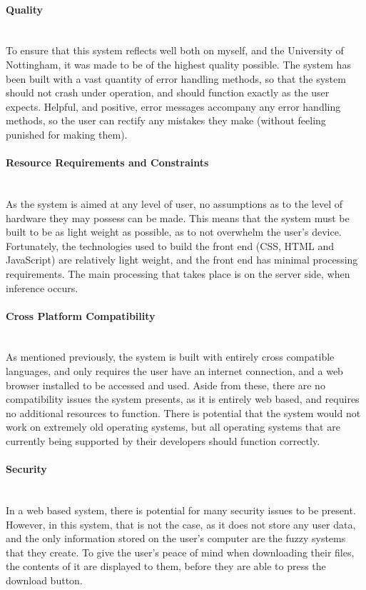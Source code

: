 \paragraph{Quality}\ \\
To ensure that this system reflects well both on myself, and the University of Nottingham, it was made to be of the highest quality possible. The system has been built with a vast quantity of error handling methods, so that the system should not crash under operation, and should function exactly as the user expects. Helpful, and positive, error messages accompany any error handling methods, so the user can rectify any mistakes they make (without feeling punished for making them). 

\paragraph{Resource Requirements and Constraints}\ \\
As the system is aimed at any level of user, no assumptions as to the level of hardware they may possess can be made. This means that the system must be built to be as light weight as possible, as to not overwhelm the user's device. Fortunately, the technologies used to build the front end (CSS, HTML and JavaScript) are relatively light weight, and the front end has minimal processing requirements. The main processing that takes place is on the server side, when inference occurs.

\paragraph{Cross Platform Compatibility}\ \\
As mentioned previously, the system is built with entirely cross compatible languages, and only requires the user have an internet connection, and a web browser installed to be accessed and used. Aside from these, there are no compatibility issues the system presents, as it is entirely web based, and requires no additional resources to function. There is potential that the system would not work on extremely old operating systems, but all operating systems that are currently being supported by their developers should function correctly.

\paragraph{Security}\ \\
In a web based system, there is potential for many security issues to be present. However, in this system, that is not the case, as it does not store any user data, and the only information stored on the user's computer are the fuzzy systems that they create. To give the user's peace of mind when downloading their files, the contents of it are displayed to them, before they are able to press the download button. 


